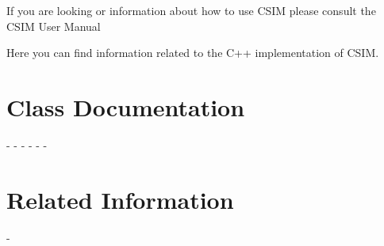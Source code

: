 If you are looking or information about how to use CSIM please consult the CSIM User Manual 

Here you can find information related to the C++ implementation of CSIM.\hypertarget{index_lists}{}\section{Class Documentation}\label{index_lists}
- - - - - -\hypertarget{index_rel}{}\section{Related Information}\label{index_rel}
- 